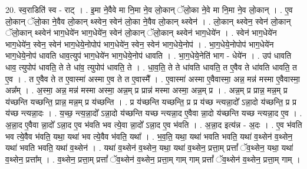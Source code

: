 \documentclass[17pt]{extarticle}
\begin{document}
20. स्व॒राडिति॑ स्व - राट् । . इ॒मा ने॒वैवे मा नि॒मा ने॒व लो॒कान् ॅलो॒का ने॒वे मा नि॒मा ने॒व लो॒कान् । . ए॒व लो॒कान् ॅलो॒का ने॒वैव लो॒कान् थ्स्वेन॒ स्वेन॑ लो॒का ने॒वैव लो॒कान् थ्स्वेन॑ । . लो॒कान् थ्स्वेन॒ स्वेन॑ लो॒कान् ॅलो॒कान् थ्स्वेन॑ भाग॒धेये॑न भाग॒धेये॑न॒ स्वेन॑ लो॒कान् ॅलो॒कान् थ्स्वेन॑ भाग॒धेये॑न । . स्वेन॑ भाग॒धेये॑न भाग॒धेये॑न॒ स्वेन॒ स्वेन॑ भाग॒धेये॒नोपोप॑ भाग॒धेये॑न॒ स्वेन॒ स्वेन॑ भाग॒धेये॒नोप॑ । . भा॒ग॒धेये॒नोपोप॑ भाग॒धेये॑न भाग॒धेये॒नोप॑ धावति धाव॒त्युप॑ भाग॒धेये॑न भाग॒धेये॒नोप॑ धावति । . भा॒ग॒धेये॒नेति॑ भाग - धेये॑न । . उप॑ धावति धाव॒ त्युपोप॑ धावति॒ ते ते धा॑व॒ त्युपोप॑ धावति॒ ते । . धा॒व॒ति॒ ते ते धा॑वति धावति॒ त ए॒वैव ते धा॑वति धावति॒ त ए॒व । . त ए॒वैव ते त ए॒वास्मा॑ अस्मा ए॒व ते त ए॒वास्मै᳚ । . ए॒वास्मा॑ अस्मा ए॒वैवास्मा॒ अन्न॒ मन्न॑ मस्मा ए॒वैवास्मा॒ अन्न᳚म् । . अ॒स्मा॒ अन्न॒ मन्न॑ मस्मा अस्मा॒ अन्न॒म् प्र प्रान्न॑ मस्मा अस्मा॒ अन्न॒म् प्र । . अन्न॒म् प्र प्रान्न॒ मन्न॒म् प्र य॑च्छन्ति यच्छन्ति॒ प्रान्न॒ मन्न॒म् प्र य॑च्छन्ति । . प्र य॑च्छन्ति यच्छन्ति॒ प्र प्र य॑च्छ न्त्यन्ना॒दो᳚ ऽन्ना॒दो य॑च्छन्ति॒ प्र प्र य॑च्छ न्त्यन्ना॒दः । . य॒च्छ॒ न्त्य॒न्ना॒दो᳚ ऽन्ना॒दो य॑च्छन्ति यच्छ न्त्यन्ना॒द ए॒वैवा न्ना॒दो य॑च्छन्ति यच्छ न्त्यन्ना॒द ए॒व । . अ॒न्ना॒द ए॒वैवा न्ना॒दो᳚ ऽन्ना॒द ए॒व भ॑वति भव त्ये॒वा न्ना॒दो᳚ ऽन्ना॒द ए॒व भ॑वति । . अ॒न्ना॒द इत्य॑न्न - अ॒दः । . ए॒व भ॑वति भव त्ये॒वैव भ॑वति॒ यथा॒ यथा॑ भव त्ये॒वैव भ॑वति॒ यथा᳚ । . भ॒व॒ति॒ यथा॒ यथा॑ भवति भवति॒ यथा॑ व॒थ्सेन॑ व॒थ्सेन॒ यथा॑ भवति भवति॒ यथा॑ व॒थ्सेन॑ । . यथा॑ व॒थ्सेन॑ व॒थ्सेन॒ यथा॒ यथा॑ व॒थ्सेन॒ प्रत्ता॒म् प्रत्तां᳚ ॅव॒थ्सेन॒ यथा॒ यथा॑ व॒थ्सेन॒ प्रत्ता᳚म् । . व॒थ्सेन॒ प्रत्ता॒म् प्रत्तां᳚ ॅव॒थ्सेन॑ व॒थ्सेन॒ प्रत्ता॒म् गाम् गाम् प्रत्तां᳚ ॅव॒थ्सेन॑ व॒थ्सेन॒ प्रत्ता॒म् गाम् । \newline
\end{document}
